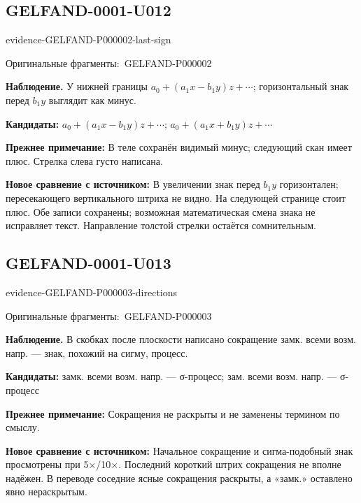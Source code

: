 \documentclass[11pt]{article}
\newcommand{\EvidenceBlock}[4]{%
 \par\smallskip\noindent\begin{minipage}{\linewidth}
 \begin{minipage}[t]{.47\linewidth}\vspace{0pt}\centering
 \csname evidence-#1-#2\endcsname\par
 {\scriptsize\SourceCropCaption\ #1}\par
 \end{minipage}\hfill
 \begin{minipage}[t]{.49\linewidth}\vspace{0pt}\raggedright
 {\small\color{orange!65!black}\textbf{#4} #3}\par
 \end{minipage}
 \end{minipage}\par\smallskip}
\newcommand{\SourceCropCaption}{Оригинальные фрагменты:}\newcommand{\ReadingCaption}{Сомнительное чтение.}\newcommand{\IncompleteCaption}{Неразобранный фрагмент.}\newcommand{\DiagramCaption}{Рисунок и набранное описание.}
\begin{document}
\subsection*{GELFAND-0001-U012}
\EvidenceBlock{GELFAND-P000002}{last-sign}{У нижней границы \(a_0+(a_1x-b_1y)z+\cdots\); горизонтальный знак перед \(b_1y\) выглядит как минус.}{Наблюдение.}
\par\smallskip\noindent\textbf{Кандидаты: } \(a_0+(a_1x-b_1y)z+\cdots\); \(a_0+(a_1x+b_1y)z+\cdots\)\par
\par\smallskip\noindent\textbf{Прежнее примечание: } В теле сохранён видимый минус; следующий скан имеет плюс. Стрелка слева густо написана.\par
\par\smallskip\noindent\textbf{Новое сравнение с источником: } В увеличении знак перед \(b_1y\) горизонтален; пересекающего вертикального штриха не видно. На следующей странице стоит плюс. Обе записи сохранены; возможная математическая смена знака не исправляет текст. Направление толстой стрелки остаётся сомнительным.\par

\subsection*{GELFAND-0001-U013}
\EvidenceBlock{GELFAND-P000003}{directions}{В скобках после плоскости написано сокращение замк. всеми возм. напр. — знак, похожий на сигму, процесс.}{Наблюдение.}
\par\smallskip\noindent\textbf{Кандидаты: } замк. всеми возм. напр. — σ-процесс; зам. всеми возм. напр. — σ-процесс\par
\par\smallskip\noindent\textbf{Прежнее примечание: } Сокращения не раскрыты и не заменены термином по смыслу.\par
\par\smallskip\noindent\textbf{Новое сравнение с источником: } Начальное сокращение и сигма-подобный знак просмотрены при 5×/10×. Последний короткий штрих сокращения не вполне надёжен. В переводе соседние ясные сокращения раскрыты, а «замк.» оставлено явно нераскрытым.\par
\end{document}
